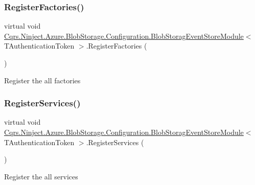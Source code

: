 \subsubsection{\texorpdfstring{Register\+Factories()}{RegisterFactories()}}
{\footnotesize\ttfamily virtual void \hyperlink{classCqrs_1_1Ninject_1_1Azure_1_1BlobStorage_1_1Configuration_1_1BlobStoragEventStoreModule}{Cqrs.\+Ninject.\+Azure.\+Blob\+Storage.\+Configuration.\+Blob\+Storag\+Event\+Store\+Module}$<$ T\+Authentication\+Token $>$.Register\+Factories (\begin{DoxyParamCaption}{ }\end{DoxyParamCaption})\hspace{0.3cm}{\ttfamily [virtual]}}



Register the all factories 

\mbox{\label{classCqrs_1_1Ninject_1_1Azure_1_1BlobStorage_1_1Configuration_1_1BlobStoragEventStoreModule_a3b50888a3c74cf1c8677722efea9665a}} 
\subsubsection{\texorpdfstring{Register\+Services()}{RegisterServices()}}
{\footnotesize\ttfamily virtual void \hyperlink{classCqrs_1_1Ninject_1_1Azure_1_1BlobStorage_1_1Configuration_1_1BlobStoragEventStoreModule}{Cqrs.\+Ninject.\+Azure.\+Blob\+Storage.\+Configuration.\+Blob\+Storag\+Event\+Store\+Module}$<$ T\+Authentication\+Token $>$.Register\+Services (\begin{DoxyParamCaption}{ }\end{DoxyParamCaption})\hspace{0.3cm}{\ttfamily [virtual]}}



Register the all services 

